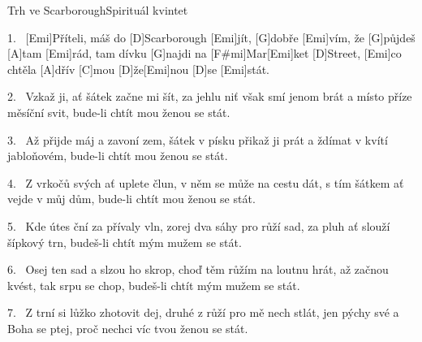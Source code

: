 \begin{song}{Trh ve Scarborough}{Spirituál kvintet}

\begin{xverse}{1.~}
[Emi]Příteli, máš do [D]Scarborough [Emi]jít,
[G]dobře [Emi]vím, že [G]půjdeš [A]tam [Emi]rád,
tam dívku [G]najdi na [F#mi]Mar[Emi]ket [D]Street,
[Emi]co chtěla [A]dřív [C]mou [D]{že}[Emi]nou [D]se [Emi]stát.
\end{xverse}

\begin{xverse}{2.~}
Vzkaž ji, ať šátek začne mi šít,
za jehlu niť však smí jenom brát
a místo příze měsíční svit,
bude-li chtít mou ženou se stát.
\end{xverse}

\begin{xverse}{3.~}
Až přijde máj a zavoní zem,
šátek v písku přikaž ji prát
a ždímat v kvítí jabloňovém,
bude-li chtít mou ženou se stát.
\end{xverse}

\begin{xverse}{4.~}
Z vrkočů svých ať uplete člun,
v něm se může na cestu dát,
s tím šátkem ať vejde v můj dům,
bude-li chtít mou ženou se stát.
\end{xverse}

\begin{xverse}{5.~}
Kde útes ční za přívaly vln,
zorej dva sáhy pro růží sad,
za pluh ať slouží šípkový trn,
budeš-li chtít mým mužem se stát.
\end{xverse}

\begin{xverse}{6.~}
Osej ten sad a slzou ho skrop,
choď těm růžím na loutnu hrát,
až začnou kvést, tak srpu se chop,
budeš-li chtít mým mužem se stát.
\end{xverse}

\begin{xverse}{7.~}
Z trní si lůžko zhotovit dej,
druhé z růží pro mě nech stlát,
jen pýchy své a Boha se ptej,
proč nechci víc tvou ženou se stát.
\end{xverse}

\end{song}

